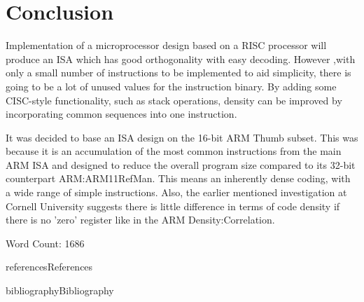 \documentclass[12pt,a4paper]{article}
\begin{document}
\section{Conclusion}
Implementation of a microprocessor design based on a RISC processor will produce an ISA which has good orthogonality with easy decoding. However ,with only a small number of instructions to be implemented to aid simplicity, there is going to be a lot of unused values for the instruction binary. By adding some CISC-style functionality, such as stack operations, density can be improved by incorporating common sequences into one instruction.

It was decided to base an ISA design on the 16-bit ARM Thumb subset. This was because it is an accumulation of the most common instructions from the main ARM ISA and designed to reduce the overall program size compared to its 32-bit counterpart \cite{ref}{ARM:ARM11RefMan}. This means an inherently dense coding, with a wide range of simple instructions. Also, the earlier mentioned investigation at Cornell University suggests there is little difference in terms of code density if there is no 'zero' register like in the ARM \cite{ref}{Density:Correlation}.

\vspace*{\baselineskip}
Word Count: 1686%

\newpage
{references}{References}

\makeatletter 
	\renewcommand\@biblabel[1]{\textbullet}
\makeatother
{bibliography}{Bibliography}
\end{document}
